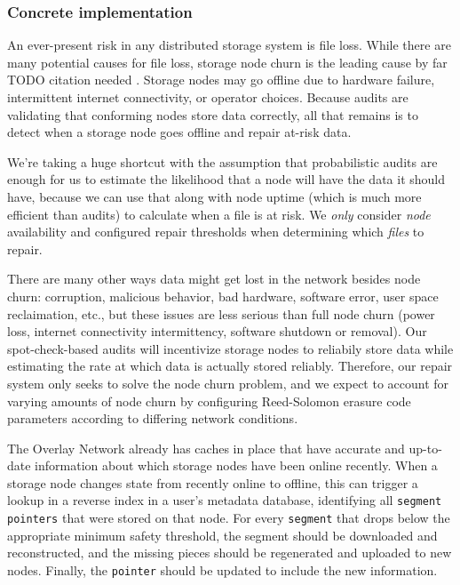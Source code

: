 \documentclass[a4paper,10pt]{article} \usepackage[utf8]{inputenc}
\newcommand{\x}[1]{{\tt #1}} \newcommand{\code}[1]{{\tt #1}}
\newcommand{\todo}[1]{{\color{red} TODO #1 }}
\begin{document}
\subsubsection{Concrete implementation}

An ever-present risk in any distributed storage system is file loss. While there
are many potential causes for file loss, storage node churn is the leading
cause by far \todo{citation needed}. Storage nodes may go offline due to
hardware failure, intermittent internet connectivity, or operator choices.
Because audits are validating that conforming nodes store data correctly, all
that remains is to detect when a storage node goes offline and repair at-risk
data.

We're taking a huge shortcut with the assumption that
probabilistic audits are enough for us to estimate the likelihood that a node
will have the data it should have, because we can use that 
along with node uptime (which is much more efficient than audits) 
to calculate when a file is at risk.
We {\em only} consider {\em node} availability and configured repair thresholds
when determining which {\em files} to repair.

There are many other ways data might get lost in the network besides node churn:
corruption, malicious behavior, bad hardware, software error, user space
reclaimation, etc., but these issues are less serious than full node 
churn (power loss, internet connectivity intermittency, 
software shutdown or removal).
Our spot-check-based audits will incentivize storage nodes to reliabily store 
data
while estimating the rate at which data is actually stored reliably.
Therefore, our repair system only seeks to solve the node churn problem, and
we expect to account for varying
amounts of node churn by configuring Reed-Solomon erasure code
parameters according to differing network conditions.

The Overlay Network already has caches in place that have accurate and
up-to-date information about which storage nodes have been online recently.
When a storage node changes state from recently online to offline, this can
trigger a lookup in a reverse index in a user's metadata database, identifying
all \x{segment} \x{pointers} that were stored on that node.
For every \x{segment} that drops below the appropriate minimum safety
threshold, the segment should be downloaded and reconstructed, and the missing
pieces should be regenerated and uploaded to new nodes. Finally, the
\x{pointer} should be updated to include the new information.
\end{document}

